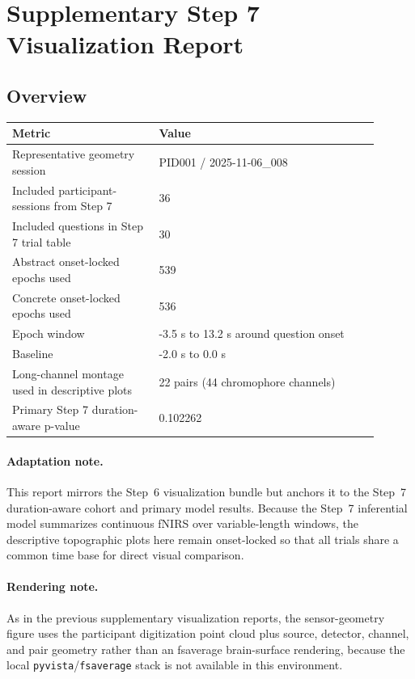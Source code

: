 \documentclass[11pt]{article}
\begin{document}
\section*{Supplementary Step 7 Visualization Report}
\subsection*{Overview}
\begin{tabular}{p{0.36\linewidth}p{0.54\linewidth}}
\toprule
Metric & Value\\
\midrule
Representative geometry session & PID001 / 2025-11-06\_008\\
Included participant-sessions from Step 7 & 36\\
Included questions in Step 7 trial table & 30\\
Abstract onset-locked epochs used & 539\\
Concrete onset-locked epochs used & 536\\
Epoch window & -3.5 s to 13.2 s around question onset\\
Baseline & -2.0 s to 0.0 s\\
Long-channel montage used in descriptive plots & 22 pairs (44 chromophore channels)\\
Primary Step 7 duration-aware p-value & 0.102262\\
\bottomrule
\end{tabular}
\paragraph{Adaptation note.} This report mirrors the Step~6 visualization bundle but anchors it to the Step~7 duration-aware cohort and primary model results. Because the Step~7 inferential model summarizes continuous fNIRS over variable-length windows, the descriptive topographic plots here remain onset-locked so that all trials share a common time base for direct visual comparison.
\paragraph{Rendering note.} As in the previous supplementary visualization reports, the sensor-geometry figure uses the participant digitization point cloud plus source, detector, channel, and pair geometry rather than an fsaverage brain-surface rendering, because the local \texttt{pyvista}/\texttt{fsaverage} stack is not available in this environment.
\end{document}
